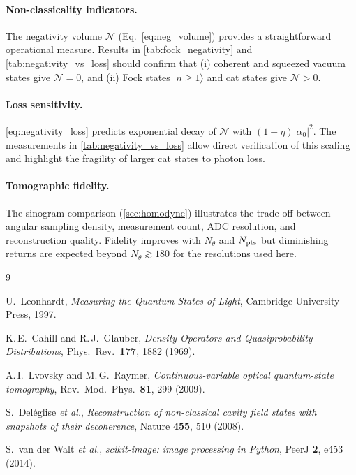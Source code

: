 \documentclass[12pt,a4paper]{article}
\begin{document}
\paragraph{Non-classicality indicators.}
The negativity volume $\mathcal{N}$ (Eq.~\ref{eq:neg_volume}) provides a straightforward operational measure. Results in \cref{tab:fock_negativity} and \cref{tab:negativity_vs_loss} should confirm that (i) coherent and squeezed vacuum states give $\mathcal{N}=0$, and (ii) Fock states $|n\geq1\rangle$ and cat states give $\mathcal{N}>0$.

\paragraph{Loss sensitivity.}
\cref{eq:negativity_loss} predicts exponential decay of $\mathcal{N}$ with $(1-\eta)|\alpha_0|^2$. The measurements in \cref{tab:negativity_vs_loss} allow direct verification of this scaling and highlight the fragility of larger cat states to photon loss.

\paragraph{Tomographic fidelity.}
The sinogram comparison (\cref{sec:homodyne}) illustrates the trade-off between angular sampling density, measurement count, ADC resolution, and reconstruction quality. Fidelity improves with $N_\theta$ and $N_{\rm pts}$ but diminishing returns are expected beyond $N_\theta\gtrsim180$ for the resolutions used here.

\begin{thebibliography}{9}

U.\ Leonhardt,
\textit{Measuring the Quantum States of Light},
Cambridge University Press, 1997.

K.\,E.\ Cahill and R.\,J.\ Glauber,
\textit{Density Operators and Quasiprobability Distributions},
Phys.\ Rev.\ \textbf{177}, 1882 (1969).

A.\,I.\ Lvovsky and M.\,G.\ Raymer,
\textit{Continuous-variable optical quantum-state tomography},
Rev.\ Mod.\ Phys.\ \textbf{81}, 299 (2009).

S.\ Del\'eglise \textit{et al.},
\textit{Reconstruction of non-classical cavity field states with snapshots of their decoherence},
Nature \textbf{455}, 510 (2008).

S.\ van der Walt \textit{et al.},
\textit{scikit-image: image processing in Python},
PeerJ \textbf{2}, e453 (2014).

\end{thebibliography}
\end{document}
